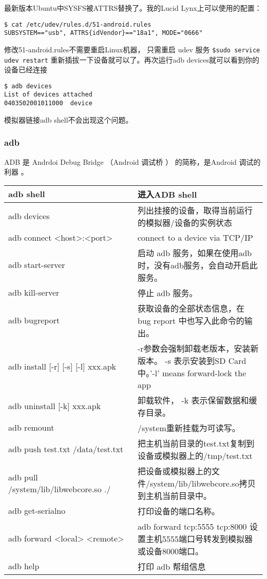 \documentclass[a4paper,titlepage]{article}
\begin{document}
最新版本Ubuntu中SYSFS被ATTRS替换了。我的Lucid Lynx上可以使用的配置：
\begin{verbatim}
$ cat /etc/udev/rules.d/51-android.rules 
SUBSYSTEM=="usb", ATTRS{idVendor}=="18a1", MODE="0666"
\end{verbatim}

修改51-android.rules不需要重启Linux机器， 只需重启 udev 服务
\verb|$sudo service udev restart|
重新插拔一下设备就可以了。再次运行adb devices就可以看到你的设备已经连接

\begin{verbatim}
$ adb devices
List of devices attached
0403502001011000  device
\end{verbatim}

 模拟器链接adb shell不会出现这个问题。

\subsubsection{adb}
ADB 是 Andrdoi Debug Bridge （Android 调试桥 ） 的简称，是Android 调试的利器 。

\begin{tabular}{|p{0.5\linewidth}|p{0.5\linewidth}|}\hline
adb shell & 进入ADB shell \\\hline
adb devices & 列出挂接的设备，取得当前运行的模拟器/设备的实例状态\\\hline
adb connect <host>:<port> & connect to a device via TCP/IP \\\hline
adb start-server & 启动 adb 服务，如果在使用adb时，没有adb服务，会自动开启此服务。\\\hline
adb kill-server & 停止 adb 服务。\\\hline
adb bugreport & 获取设备的全部状态信息，在 bug report 中也写入此命令的输出。\\\hline
adb install [-r] [-s] [-l] xxx.apk & -r参数会强制卸载老版本，安装新版本。 -s 表示安装到SD Card中。'-l' means forward-lock the app\\\hline
adb uninstall [-k] xxx.apk & 卸载软件， -k 表示保留数据和缓存目录。                 \\\hline
adb remount & /system重新挂载为可读写。\\\hline
adb push test.txt /data/test.txt & 把主机当前目录的test.txt复制到设备或模拟器上的/tmp/test.txt\\\hline
adb pull /system/lib/libwebcore.so ./ &把设备或模拟器上的文件/system/lib/libwebcore.so拷贝到主机当前目录中。\\\hline
adb get-serialno & 打印设备的端口名称。\\\hline
adb forward <local> <remote> & adb forward tcp:5555 tcp:8000 设置主机5555端口号转发到模拟器或设备8000端口。\\\hline
adb help & 打印 adb 帮组信息\\\hline
\end{tabular}
\end{document}
